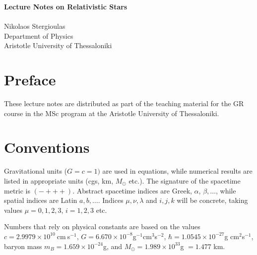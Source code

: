 \documentclass[12pt]{article}
\begin{document}
\begin{center}
{\large \bf Lecture Notes on Relativistic Stars} \\
\hspace{1cm}\\
 {\large Nikolaos Stergioulas} \\
 \vskip0.2cm
  Department of Physics\\ Aristotle University of Thessaloniki
\end{center}

\section*{Preface}

These lecture notes are distributed as part of the teaching material for the GR course in the MSc program at the Aristotle University of Thessaloniki.

\section*{Conventions}

Gravitational units ($G = c = 1)$ are used in equations,  while numerical results are listed in appropriate units (cgs, km, $M_\odot$ etc.).  The signature of the spacetime
metric is $(-+++)$. Abstract spacetime indices are Greek, $\alpha$, $\beta,
\ldots$, while spatial indices are Latin $a, b, \ldots$.
Indices $\mu, \nu, \lambda$ and
$i,j,k$ will be concrete, taking values $\mu = 0,1,2,3$, $i=1,2,3$ etc.


Numbers that rely on physical constants are based on the values
$c = 2.9979  \times10^{10}\ $cm$\ $s$^{-1}$, \enskip
$G = 6.670\times10^{-8} $g$^{-1} $cm$^{3} $s$^{-2}$, \enskip
$\hbar = 1.0545\times10^{-27} $g cm$^{2}$s$^{-1}$, \enskip
baryon mass $m_B = 1.659\times 10^{-24}$g, and
$M_\odot = 1.989\times10^{33}$g $ = 1.477$ km.



\label{chap1}

 \vskip0.4cm

\end{document}
